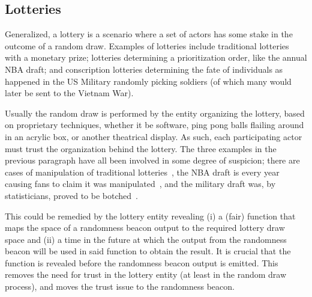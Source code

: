 \subsection{Lotteries}\label{subsec:usecase_lotteries}
Generalized, a lottery is a scenario where a set of actors has some stake in the outcome of a random draw. Examples of lotteries include traditional lotteries with a monetary prize; lotteries determining a prioritization order, like the annual NBA draft; and conscription lotteries determining the fate of individuals as happened in the US Military randomly picking soldiers (of which many would later be sent to the Vietnam War).

Usually the random draw is performed by the entity organizing the lottery, based on proprietary techniques, whether it be software, ping pong balls flailing around in an acrylic box, or another theatrical display. As such, each participating actor must trust the organization behind the lottery. The three examples in the previous paragraph have all been involved in some degree of suspicion; there are cases of manipulation of traditional lotteries~\cite{lotteryscandal-eddietipton, lotteryscandal-666}, the NBA draft is every year causing fans to claim it was manipulated~\cite{nbalottery}, and the military draft was, by statisticians, proved to be botched~\cite{starr1997nonrandom}.

This could be remedied by the lottery entity revealing (i) a (fair) function that maps the space of a randomness beacon output to the required lottery draw space and (ii) a time in the future at which the output from the randomness beacon will be used in said function to obtain the result. It is crucial that the function is revealed before the randomness beacon output is emitted. This removes the need for trust in the lottery entity (at least in the random draw process), and moves the trust issue to the randomness beacon.

